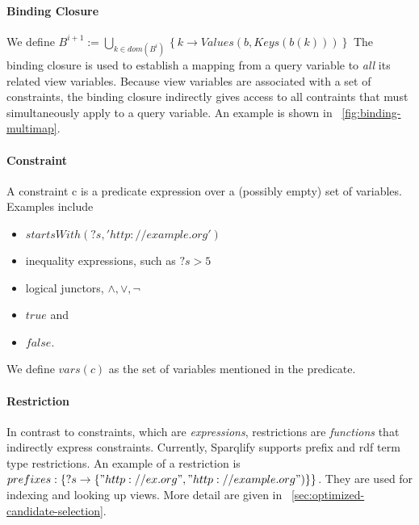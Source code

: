 \documentclass[a4paper,twoside,bibtotoc,abstracton,12pt,BCOR=15mm]{scrreprt}
\newcommand{\todo}[1]{\textbf{ToDo: \textit{#1}}}
\begin{document}
\paragraph{Binding Closure}
We define $B^{i+1} := \bigcup_{k \in dom(B^i)} \left \{ k \rightarrow Values(b, Keys(b(k))) \right \}$
The binding closure is used to establish a mapping from a query variable to \emph{all} its related view variables.
Because view variables are associated with a set of constraints, the binding closure indirectly gives access to all contraints that must simultaneously apply to a query variable.
An example is shown in ~\autoref{fig:binding-multimap}.

\paragraph{Constraint}
A constraint c is a predicate expression over a (possibly empty) set of variables.
Examples include
\begin{itemize}
\item $startsWith(?s, 'http://example.org')$
\item inequality expressions, such as $?s > 5$
\item logical junctors, $\wedge, \vee, \lnot$
\item $true$ and
\item $false$.
\end{itemize}
We define $vars(c)$ as the set of variables mentioned in the predicate.


\paragraph{Restriction}
In contrast to constraints, which are \emph{expressions}, restrictions are \emph{functions} that indirectly express constraints.
Currently, Sparqlify supports prefix and rdf term type restrictions.
An example of a restriction is $prefixes: \left \{ ?s \rightarrow \left \{ "http://ex.org", "http://example.org") \right \} \right \}$.
They are used for indexing and looking up views. More detail are given in ~\autoref{sec:optimized-candidate-selection}.
 

\end{document}
